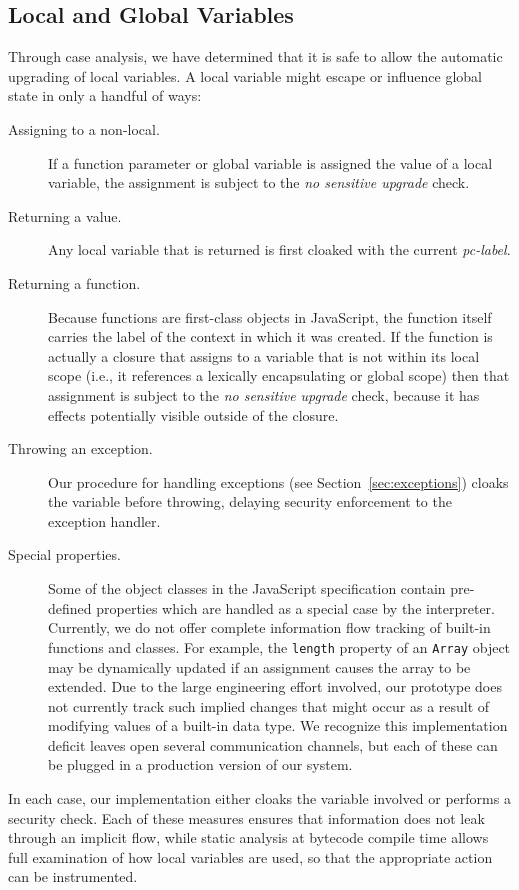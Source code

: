 \documentclass{llncs}
\begin{document}
\subsection{Local and Global Variables}
Through case analysis, we have determined that it is safe to allow the automatic upgrading of local variables.
A local variable might escape or influence global state in only a handful of ways:
\begin{description}
 \item[Assigning to a non-local.] If a function parameter or global variable is assigned the value of a local variable, the assignment is subject to the \textit{no sensitive upgrade} check.
 \item[Returning a value.] Any local variable that is returned is first cloaked with the current \textit{pc-label}.
 \item[Returning a function.] Because functions are first-class objects in JavaScript, the function itself carries the label of the context in which it was created.
 If the function is actually a closure that assigns to a variable that is not within its local scope (i.e., it references a lexically encapsulating or global scope) then that assignment is subject to the \textit{no sensitive upgrade} check, because it has effects potentially visible outside of the closure.
 \item[Throwing an exception.] Our procedure for handling exceptions (see Section~\ref{sec:exceptions}) cloaks the variable before throwing, delaying security enforcement to the exception handler.
 \item[Special properties.]
  Some of the object classes in the JavaScript specification contain pre-defined properties which are handled as a special case by the interpreter.
  Currently, we do not offer complete information flow tracking of built-in functions and classes.
  For example, the \texttt{length} property of an \texttt{Array} object may be dynamically updated if an assignment causes the array to be extended.
  Due to the large engineering effort involved, our prototype does not currently track such implied changes that might occur as a result of modifying values of a built-in data type.
  We recognize this implementation deficit leaves open several communication channels, but each of these can be plugged in a production version of our system.
\end{description}
In each case, our implementation either cloaks the variable involved or performs a security check.
Each of these measures ensures that information does not leak through an implicit flow, while static analysis at bytecode compile time allows full examination of how local variables are used, so that the appropriate action can be instrumented.
\end{document}
